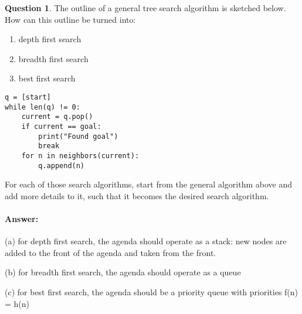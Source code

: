 \documentclass[11pt,a4paper]{article}
\theoremstyle{definition}%
\newtheorem{Q}{Question}[] %
\newcommand{\reponse}[1]{%
\ifthenelse {\boolean{corrige}} {\paragraph{Answer:} \color{darkblue}   #1\color{black}} {}
}
\begin{document}
\begin{Q}
The outline of a general tree search algorithm is sketched below. How can this outline be
turned into:
\begin{enumerate}
    \item depth first search
    \item breadth first search
    \item best first search
\end{enumerate}

\begin{verbatim}
q = [start]
while len(q) != 0:
    current = q.pop()
    if current == goal:
        print("Found goal")
        break
    for n in neighbors(current):
        q.append(n)
\end{verbatim}

For each of those search algorithms, start from the general algorithm above and add more
details to it, such that it becomes the desired search algorithm.
\reponse{
(a) for depth first search, the agenda should operate as a stack: new nodes are added to
the front of the agenda and taken from the front.

(b) for breadth first search, the agenda should operate as a queue

(c) for best first search, the agenda should be a priority queue with priorities f(n) = h(n)

}
\end{Q}
\end{document}
